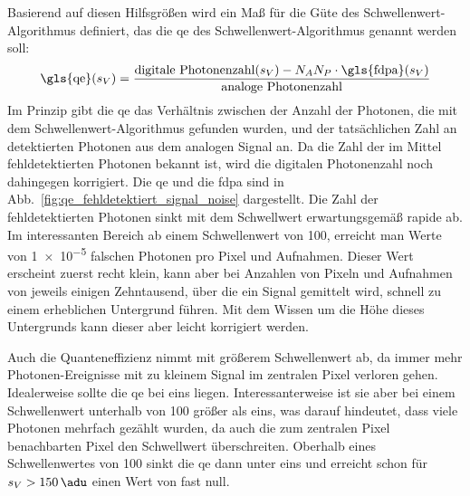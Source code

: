 \noindent
Basierend auf diesen Hilfsgrößen wird ein Maß für die Güte des Schwellenwert-Algorithmus definiert, das die \gls{qe} des Schwellenwert-Algorithmus genannt werden soll:
\begin{equation}
    \text{\gls{qe}}(s_V) = \frac{\text{digitale Photonenzahl}(s_V) - N_A N_P \cdot \text{\gls{fdpa}}(s_V)}{\text{analoge Photonenzahl}}
\end{equation}
Im Prinzip gibt die \gls{qe} das Verhältnis zwischen der Anzahl der Photonen, die mit dem Schwellenwert-Algorithmus gefunden wurden, und der tatsächlichen Zahl an detektierten Photonen aus dem analogen Signal an. Da die Zahl der im Mittel fehldetektierten Photonen bekannt ist, wird die digitalen Photonenzahl noch dahingegen korrigiert. Die \gls{qe} und die \gls{fdpa} sind in Abb.~\ref{fig:qe_fehldetektiert_signal_noise} dargestellt. Die Zahl der fehldetektierten Photonen sinkt mit dem Schwellwert erwartungsgemäß rapide ab. Im interessanten Bereich ab einem Schwellenwert von \SI{100}{\adu}, erreicht man Werte von \num{1e-5} falschen Photonen pro Pixel und Aufnahmen. Dieser Wert erscheint zuerst recht klein, kann aber bei Anzahlen von Pixeln und Aufnahmen von jeweils einigen Zehntausend, über die ein Signal gemittelt wird, schnell zu einem erheblichen Untergrund führen. Mit dem Wissen um die Höhe dieses Untergrunds kann dieser aber leicht korrigiert werden.

\noindent
Auch die Quanteneffizienz nimmt mit größerem Schwellenwert ab, da immer mehr Photonen-Ereignisse mit zu kleinem Signal im zentralen Pixel verloren gehen. Idealerweise sollte die \gls{qe} bei eins liegen. Interessanterweise ist sie aber bei einem Schwellenwert unterhalb von \SI{100}{\adu} größer als eins, was darauf hindeutet, dass viele Photonen mehrfach gezählt wurden, da auch die zum zentralen Pixel benachbarten Pixel den Schwellwert überschreiten. Oberhalb eines Schwellenwertes von \SI{100}{\adu} sinkt die \gls{qe} dann unter eins und erreicht schon für $s_V > \SI{150}{\adu}$ einen Wert von fast null.

